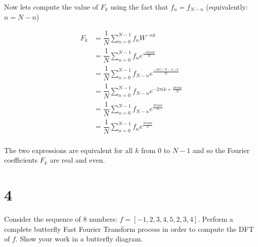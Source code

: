 \documentclass[11pt]{article}
\begin{document}
Now lets compute the value of $F_k$ using the fact that $f_n = f_{N-n}$ (equivalently: $n = N - n$)

\begin{align*}
  F_k &= \dfrac{1}{N} \sum_{n=0}^{N-1} f_n W^{-nk} \\
  &= \dfrac{1}{N} \sum_{n=0}^{N-1} f_n e^{\frac{- 2 \pi i n k}{N}} \\
  &= \dfrac{1}{N} \sum_{n=0}^{N-1} f_{N-n} e^{\frac{- 2 \pi i (N - n) k}{N}} \\
  &= \dfrac{1}{N} \sum_{n=0}^{N-1} f_{N-n} e^{- 2 \pi i k + \frac{2 \pi i n k}{N}} \\
  &= \dfrac{1}{N} \sum_{n=0}^{N-1} f_{N-n} e^{\frac{2 \pi i n k}{N}} \\
  &= \dfrac{1}{N} \sum_{n=0}^{N-1} f_{n} e^{\frac{2 \pi i n k}{N}} \\
\end{align*}

The two expressions are equivalent for all $k$ from $0$ to $N - 1$ and so the Fourier coefficients $F_k$ are real and even.

\newpage

\section{4}

Consider the sequence of 8 numbers: $f = [-1, 2, 3, 4, 5, 2, 3, 4]$. Perform a complete butterfly Fast Fourier Transform process in order to compute the DFT of $f$. Show your work in a butterfly diagram.
\end{document}
